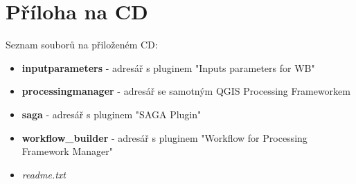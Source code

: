 \chapter*{Příloha na CD}

\noindent Seznam souborů na přiloženém CD:

\begin{itemize}
	\item \textbf{inputparameters} - adresář s pluginem "Inputs parameters for WB"
	\item \textbf{processingmanager} - adresář se samotným QGIS Processing Frameworkem
	\item \textbf{saga} - adresář s pluginem "SAGA Plugin"
	\item \textbf{workflow\_builder} - adresář s pluginem "Workflow for Processing Framework Manager"
	\item \textit{readme.txt}
\end{itemize}






